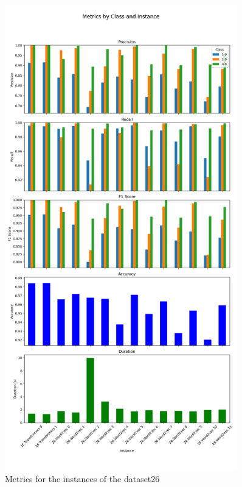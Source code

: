 \begin{figure}[h!]
\centering
\includegraphics[width=0.9\textwidth]{img/annexes/26/26 - Metrics.png}
\caption{Metrics for the instances of the dataset26}
\label{fig:26_metrics_instance}
\end{figure}

